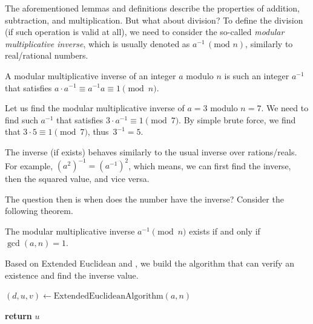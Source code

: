\documentclass[../../book.tex]{subfiles}
\begin{document}
The aforementioned lemmas and definitions describe the properties of addition, subtraction, and multiplication. But what about division? To define the division (if such operation is valid at all), we need to consider the so-called \emph{modular multiplicative inverse}, which is usually denoted as $a^{-1} \, (\text{mod } n)$, similarly to real/rational numbers.

\begin{definition}
    A modular multiplicative inverse of an integer $a$ modulo $n$ is such an integer $a^{-1}$ that satisfies $a \cdot a^{-1} \equiv a^{-1}a \equiv 1 \pmod{n}$.
\end{definition}

\begin{example}
    Let us find the modular multiplicative inverse of $a = 3$ modulo $n = 7$.
    We need to find such $a^{-1}$ that satisfies $3 \cdot a^{-1} \equiv 1 \pmod{7}$.
    By simple brute force, we find that $3 \cdot 5 \equiv 1 \pmod{7}$, thus~$3^{-1} = 5$.
\end{example}

\begin{remark}
    The inverse (if exists) behaves similarly to the usual inverse over rations/reals. For example, $(a^{2})^{-1} = (a^{-1})^{2}$, which means, we can first find the inverse, then the squared value, and vice versa.
\end{remark}

The question then is when does the number have the inverse? Consider the following theorem.

\begin{theorem}\label{th:inverse_existence}
    The modular multiplicative inverse $a^{-1} \pmod{n}$ exists if and only if $\gcd(a, n) = 1$.
\end{theorem}

Based on Extended Euclidean  and , we build the algorithm that can verify an existence and find the inverse value.

\begin{algorithm}[H]
    \caption{Modular multiplicative inverse algorithm} \label{alg:modular_inverse}
        
    $(d, u, v) \gets \text{ExtendedEuclideanAlgorithm}(a, n)$ 


    \textbf{return} $u$
\end{algorithm}
\end{document}
